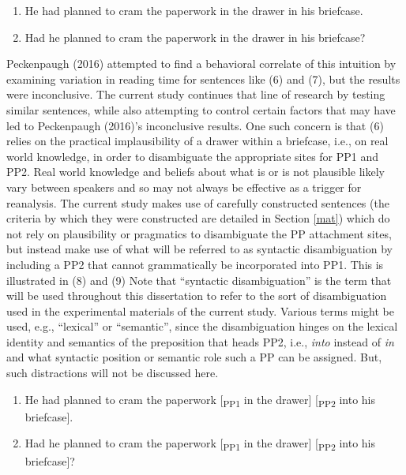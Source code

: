 \documentclass[11pt,oneside]{book}
\begin{document}
\begin{enumerate}
\def\labelenumi{(\arabic{enumi})}
\setcounter{enumi}{5}
\item
  He had planned to cram the paperwork in the drawer in his briefcase.
\item
  Had he planned to cram the paperwork in the drawer in his briefcase?
\end{enumerate}

Peckenpaugh (2016) attempted to find a behavioral correlate of this intuition by examining variation in reading time for sentences like (6) and (7), but the results were inconclusive. The current study continues that line of research by testing similar sentences, while also attempting to control certain factors that may have led to Peckenpaugh (2016)'s inconclusive results. One such concern is that (6) relies on the practical implausibility of a drawer within a briefcase, i.e., on real world knowledge, in order to disambiguate the appropriate sites for PP1 and PP2. Real world knowledge and beliefs about what is or is not plausible likely vary between speakers and so may not always be effective as a trigger for reanalysis. The current study makes use of carefully constructed sentences (the criteria by which they were constructed are detailed in Section \ref{mat}) which do not rely on plausibility or pragmatics to disambiguate the PP attachment sites, but instead make use of what will be referred to as syntactic disambiguation by including a PP2 that cannot grammatically be incorporated into PP1. This is illustrated in (8) and (9) Note that ``syntactic disambiguation'' is the term that will be used throughout this dissertation to refer to the sort of disambiguation used in the experimental materials of the current study. Various terms might be used, e.g., ``lexical'' or ``semantic'', since the disambiguation hinges on the lexical identity and semantics of the preposition that heads PP2, i.e., \emph{into} instead of \emph{in} and what syntactic position or semantic role such a PP can be assigned. But, such distractions will not be discussed here.

\begin{enumerate}
\def\labelenumi{(\arabic{enumi})}
\setcounter{enumi}{7}
\item
  He had planned to cram the paperwork {[}\textsubscript{PP1} in the drawer{]} {[}\textsubscript{PP2} into his briefcase{]}.
\item
  Had he planned to cram the paperwork {[}\textsubscript{PP1} in the drawer{]} {[}\textsubscript{PP2} into his briefcase{]}?
\end{enumerate}
\end{document}

